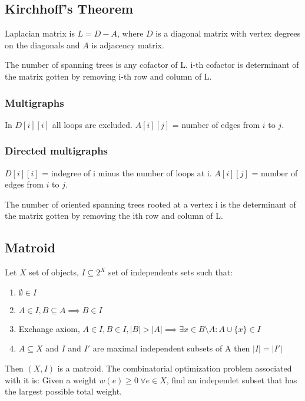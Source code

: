\documentclass[a4paper,10pt,oneside]{article}
\begin{document}
\begin{multicols}{2}
\subsection{Kirchhoff's Theorem}
Laplacian matrix is $L = D - A$, where $D$ is a diagonal matrix with vertex degrees on the diagonals and $A$ is adjacency matrix.

The number of spanning trees is any cofactor of L. i-th cofactor is determinant of the matrix gotten by removing i-th row and column of L.

\subsubsection{Multigraphs}
In $D[i][i]$ all loops are excluded. $A[i][j]$ = number of edges from $i$ to $j$.

\subsubsection{Directed multigraphs}
$D[i][i]$ = indegree of i minus the number of loops at i. $A[i][j]$ = number of edges from $i$ to $j$.

The number of oriented spanning trees rooted at a vertex i is the determinant of the matrix gotten by removing the ith row and column of L.

\subsection{Matroid}
Let $X$ set of objects, $I \subseteq 2^X$ set of independents sets such that:
\begin{enumerate}
\item $\emptyset \in I$
\item $A \in I, B \subseteq A \implies B \in I$
\item Exchange axiom, $A \in I, B \in I, |B| > |A| \implies \exists x \in B \setminus A : A \cup \{x\} \in I$
\item $A \subseteq X$ and $I$ and $I'$ are maximal independent subsets of A then $|I| = |I'|$
\end{enumerate}
Then $(X, I)$ is a matroid. The combinatorial optimization problem associated with it is: Given a weight $w(e) \geq 0 ~\forall e \in X$, find an independet subset that has the largest possible total weight.


\end{multicols}
\end{document}
